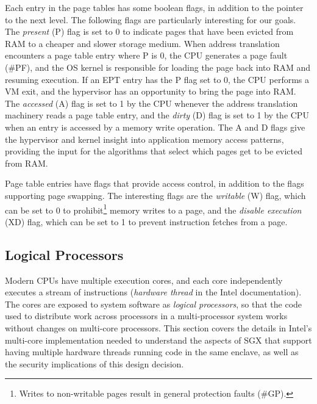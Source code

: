 Each entry in the page tables has some boolean flags, in addition to the
pointer to the next level. The following flags are particularly interesting for
our goals. The \textit{present} (P) flag is set to 0 to indicate pages that
have been evicted from RAM to a cheaper and slower storage medium. When address
translation encounters a page table entry where P is 0, the CPU generates a
page fault (\#PF), and the OS kernel is responsible for loading the page back
into RAM and resuming execution. If an EPT entry has the P flag set to 0, the
CPU performs a VM exit, and the hypervisor has an opportunity to bring the page
into RAM. The \textit{accessed} (A) flag is set to 1 by the CPU whenever the
address translation machinery reads a page table entry, and the \textit{dirty}
(D) flag is set to 1 by the CPU when an entry is accessed by a memory write
operation. The A and D flags give the hypervisor and kernel insight into
application memory access patterns, providing the input for the algorithms that
select which pages get to be evicted from RAM.

Page table entries have flags that provide access control, in addition to the
flags supporting page swapping. The interesting flags are the \textit{writable}
(W) flag, which can be set to 0 to prohibit\footnote{Writes to non-writable
pages result in general protection faults (\#GP).} memory writes to a page, and
the \textit{disable execution} (XD) flag, which can be set to 1 to prevent
instruction fetches from a page.


\subsection{Logical Processors}
\label{sec:cores}





Modern CPUs have multiple execution cores, and each core independently executes
a stream of instructions (\textit{hardware thread} in the Intel documentation).
The cores are exposed to system software as \textit{logical processors}, so
that the code used to distribute work across processors in a multi-processor
system works without changes on multi-core processors. This section covers the
details in Intel's multi-core implementation needed to understand the aspects
of SGX that support having multiple hardware threads running code in the same
enclave, as well as the security implications of this design decision.

